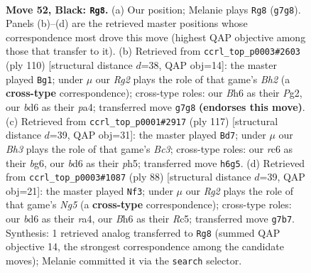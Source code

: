 \documentclass[11pt]{article}
\begin{document}
\clearpage

\begin{figure}[p]\centering
\begin{subfigure}{0.46\textwidth}\centering
\resizebox{\linewidth}{!}{%
\newchessgame
\chessboard[
  setfen={k7/p5r1/PpRB3b/1B3p2/5P1n/4K3/8/8 b - - 0 52},
  showmover=false,
  pgfstyle=straightmove, color=movearrow, markmove={g7-g8}
]}
\caption{}
\end{subfigure}\hfill
\begin{subfigure}{0.46\textwidth}\centering
\resizebox{\linewidth}{!}{%
\newchessgame
\chessboard[
  setfen={8/8/2RP1bk1/5p2/p2r3p/5K1P/6PB/8 w - - 2 56},
  showmover=false,
  pgfstyle=straightmove, color=movearrow, markmove={h2-g1}
]}
\caption{}
\end{subfigure}
\\[4pt]
\begin{subfigure}{0.46\textwidth}\centering
\resizebox{\linewidth}{!}{%
\newchessgame
\chessboard[
  setfen={5k2/6p1/2b3Bp/3r1p1P/P7/1P2R3/8/4K3 b - - 14 59},
  showmover=false,
  pgfstyle=straightmove, color=movearrow, markmove={c6-d7}
]}
\caption{}
\end{subfigure}\hfill
\begin{subfigure}{0.46\textwidth}\centering
\resizebox{\linewidth}{!}{%
\newchessgame
\chessboard[
  setfen={8/3k4/6p1/p1R1PbN1/r6p/4K2P/6P1/8 w - - 0 45},
  showmover=false,
  pgfstyle=straightmove, color=movearrow, markmove={g5-f3}
]}
\caption{}
\end{subfigure}
\caption{\textbf{Move 52, Black: \texttt{Rg8}.} (a) Our position; Melanie plays \texttt{Rg8} (\texttt{g7g8}). Panels (b)--(d) are the retrieved master positions whose correspondence most drove this move (highest QAP objective among those that transfer to it). (b) Retrieved from \texttt{ccrl\_top\_p0003\#2603} (ply 110) [structural distance $d$=38, QAP obj=14]: the master played \texttt{Bg1}; under $\mu$ our \emph{Rg2} plays the role of that game's \emph{Bh2} (a \textbf{cross-type} correspondence); cross-type roles: our \emph{B}h6 as their \emph{P}g2, our \emph{b}d6 as their \emph{p}a4; transferred move \texttt{g7g8} \textbf{(endorses this move)}. (c) Retrieved from \texttt{ccrl\_top\_p0001\#2917} (ply 117) [structural distance $d$=39, QAP obj=31]: the master played \texttt{Bd7}; under $\mu$ our \emph{Bh3} plays the role of that game's \emph{Bc3}; cross-type roles: our \emph{r}c6 as their \emph{b}g6, our \emph{b}d6 as their \emph{p}h5; transferred move \texttt{h6g5}. (d) Retrieved from \texttt{ccrl\_top\_p0003\#1087} (ply 88) [structural distance $d$=39, QAP obj=21]: the master played \texttt{Nf3}; under $\mu$ our \emph{Rg2} plays the role of that game's \emph{Ng5} (a \textbf{cross-type} correspondence); cross-type roles: our \emph{b}d6 as their \emph{r}a4, our \emph{B}h6 as their \emph{R}c5; transferred move \texttt{g7b7}. Synthesis: 1 retrieved analog transferred to \texttt{Rg8} (summed QAP objective 14, the strongest correspondence among the candidate moves); Melanie committed it via the \texttt{search} selector.}
\label{fig:thought-m103}
\end{figure}
\end{document}
